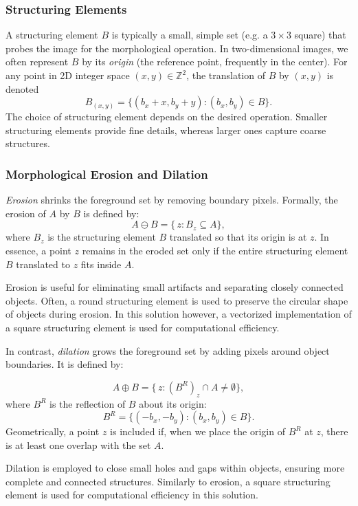 \documentclass[a4paper,12pt]{article}
\begin{document}
\subsubsection{Structuring Elements}

A structuring element \(B\) is typically a small, simple set (e.g. a \(3 \times 3\) square) that probes the image for the morphological operation. In two-dimensional images, we often represent \(B\) by its \emph{origin} (the reference point, frequently in the center). For any point in 2D integer space \((x, y) \in \mathbb{Z}^2\), the translation of \(B\) by \((x, y)\) is denoted
\[
  B_{(x,y)} = \{(b_x + x, b_y + y) : (b_x, b_y) \in B \}.
\]
The choice of structuring element depends on the desired operation. Smaller structuring elements provide fine details, whereas larger ones capture coarse structures.

\subsubsection{Morphological Erosion and Dilation}

\emph{Erosion} shrinks the foreground set by removing boundary pixels. Formally, the erosion of \(A\) by \(B\) is defined by:
\[
  A \ominus B = \{\,z : B_{z} \subseteq A \},
\]
where \(B_z\) is the structuring element \(B\) translated so that its origin is at \(z\). In essence, a point \(z\) remains in the eroded set only if the entire structuring element \(B\) translated to \(z\) fits inside \(A\).

Erosion is useful for eliminating small artifacts and separating closely connected objects. Often, a round structuring element is used to preserve the circular shape of objects during erosion. In this solution however, a vectorized implementation of a square structuring element is used for computational efficiency.

In contrast, \emph{dilation} grows the foreground set by adding pixels around object boundaries. It is defined by:

\[
  A \oplus B = \{\,z : (B^R)_{z} \cap A \neq \emptyset \},
\]
where \(B^R\) is the reflection of \(B\) about its origin:
\[
  B^R = \{(-b_x, -b_y) : (b_x, b_y) \in B \}.
\]
Geometrically, a point \(z\) is included if, when we place the origin of \(B^R\) at \(z\), there is at least one overlap with the set \(A\).

Dilation is employed to close small holes and gaps within objects, ensuring more complete and connected structures. Similarly to erosion, a square structuring element is used for computational efficiency in this solution.
\end{document}
